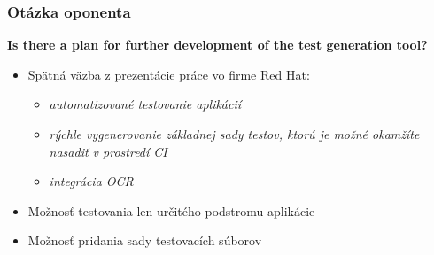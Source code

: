 \documentclass[10pt,xcolor=pdflatex,hyperref={unicode}]{beamer}
\begin{document}

\appendix
\begin{frame}[fragile]\frametitle{Otázka oponenta}

\begin{block}{\vspace{2mm}\textbf{Is there a plan for further development of the test generation tool?}\vspace{2mm}}

\begin{itemize}
\item Spätná väzba z prezentácie práce vo firme Red Hat:
\begin{itemize}
\item \emph{automatizované testovanie aplikácií}
\item \emph{rýchle vygenerovanie základnej sady testov, ktorú je možné okamžíte nasadiť v prostredí CI}
\item \emph{integrácia OCR}
\end{itemize}
\item Možnosť testovania len určitého podstromu aplikácie
\item Možnosť pridania sady testovacích súborov

\end{itemize}

\end{block}
    
\end{frame}
\end{document}
